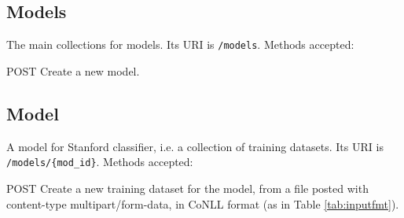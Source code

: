 \documentclass[a4paper,11pt]{report}
\begin{document}
\subsection*{Models}
The main collections for models. Its URI is \texttt{/models}. Methods accepted:
\begin{description}
\item{POST} Create a new model.
\end{description}
\subsection*{Model}
A model for Stanford classifier, i.e. a collection of training datasets. Its URI is \texttt{/models/\{mod\_id\}}. Methods accepted:
\begin{description}
\item{POST} Create a new training dataset for the model, from a file posted with content-type multipart/form-data, in CoNLL format (as in Table \ref{tab:inputfmt}). 
\end{description}
\end{document}
